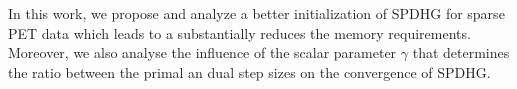 \documentclass[11pt,twocolumn,twoside]{article}
\begin{document}
\smallskip

In this work, we propose and analyze a better initialization of SPDHG for sparse PET data
which leads to a substantially reduces the memory requirements.
Moreover, we also analyse the influence of the scalar parameter $\gamma$ that determines
the ratio between the primal an dual step sizes on the convergence of SPDHG.




\printbibliography
\end{document}
